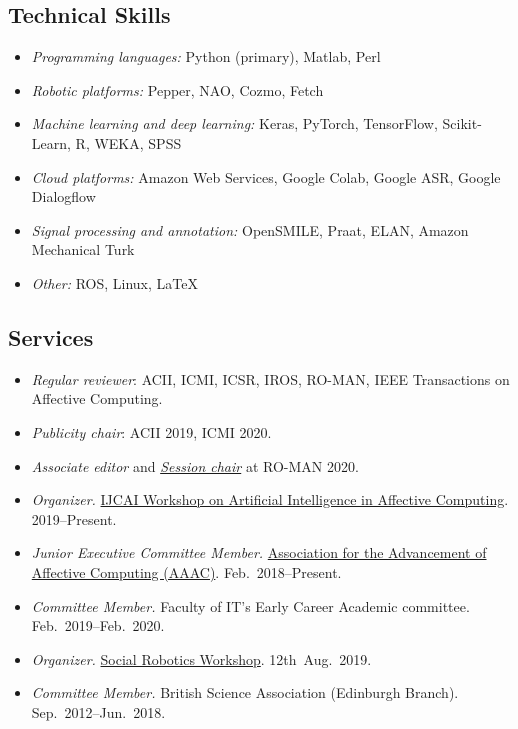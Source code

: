 \documentclass[11pt,letterpaper]{article}
\begin{document}
\subsection*{Technical Skills}
\begin{itemize}
  \item \emph{Programming languages:} Python (primary), Matlab, Perl
  \item \emph{Robotic platforms:} Pepper, NAO, Cozmo, Fetch
  \item \emph{Machine learning and deep learning:} Keras, PyTorch, TensorFlow, Scikit-Learn, R, WEKA, SPSS
  \item \emph{Cloud platforms:} Amazon Web Services, Google Colab, Google ASR, Google Dialogflow
  \item \emph{Signal processing and annotation:} OpenSMILE, Praat, ELAN, Amazon Mechanical Turk
  \item \emph{Other:} ROS, Linux, \LaTeX
\end{itemize}

\subsection*{Services}
\begin{itemize}
  \item \emph{Regular reviewer}: ACII, ICMI, ICSR, IROS, RO-MAN, IEEE Transactions on Affective Computing.
  \item \emph{Publicity chair}: ACII 2019, ICMI 2020.
  \item \emph{Associate editor} and \href{https://underline.io/events/28/sessions?eventSessionId=365}{\emph{Session chair}} at RO-MAN 2020.
  \item \emph{Organizer.} \href{http://kdd.cs.ksu.edu/Workshops/IJCAI-2020-AffComp/index.html}{IJCAI Workshop on Artificial Intelligence in Affective Computing}. 2019--Present.
  \item \emph{Junior Executive Committee Member.}  \href{https://aaac.cs.nott.ac.uk/}{Association for the Advancement of Affective Computing (AAAC)}. Feb.~2018--Present.
  \item \emph{Committee Member.} Faculty of IT's Early Career Academic committee. Feb.~2019--Feb.~2020.
  \item \emph{Organizer.} \href{https://sites.google.com/monash.edu/socialroboticsworkshop/home}{Social Robotics Workshop}. 12th~Aug.~2019.
  \item \emph{Committee Member.} British Science Association (Edinburgh Branch). Sep.~2012--Jun.~2018.
\end{itemize}
\end{document}
